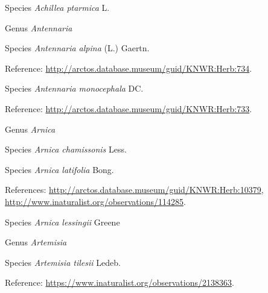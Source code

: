 \documentclass[9pt, article]{memoir}
\begin{document}
\begin{multicols}{2}
\vspace{6pt}\noindent\hspace{36pt}Species \textit{Achillea ptarmica} L.


\vspace{6pt}\noindent\hspace{30pt}Genus \textit{Antennaria}


\vspace{6pt}\noindent\hspace{36pt}Species \textit{Antennaria alpina} (L.) Gaertn.


\vspace{6pt}Reference: 
\url{http://arctos.database.museum/guid/KNWR:Herb:734}.

\vspace{6pt}\noindent\hspace{36pt}Species \textit{Antennaria monocephala} DC.


\vspace{6pt}Reference: 
\url{http://arctos.database.museum/guid/KNWR:Herb:733}.

\vspace{6pt}\noindent\hspace{30pt}Genus \textit{Arnica}


\vspace{6pt}\noindent\hspace{36pt}Species \textit{Arnica chamissonis} Less.


\vspace{6pt}\noindent\hspace{36pt}Species \textit{Arnica latifolia} Bong.


\vspace{6pt}References: 
\url{http://arctos.database.museum/guid/KNWR:Herb:10379}, 
\url{http://www.inaturalist.org/observations/114285}.

\vspace{6pt}\noindent\hspace{36pt}Species \textit{Arnica lessingii} Greene


\vspace{6pt}\noindent\hspace{30pt}Genus \textit{Artemisia}


\vspace{6pt}\noindent\hspace{36pt}Species \textit{Artemisia tilesii} Ledeb.


\vspace{6pt}Reference: 
\url{https://www.inaturalist.org/observations/2138363}.


\end{multicols}
\end{document}
